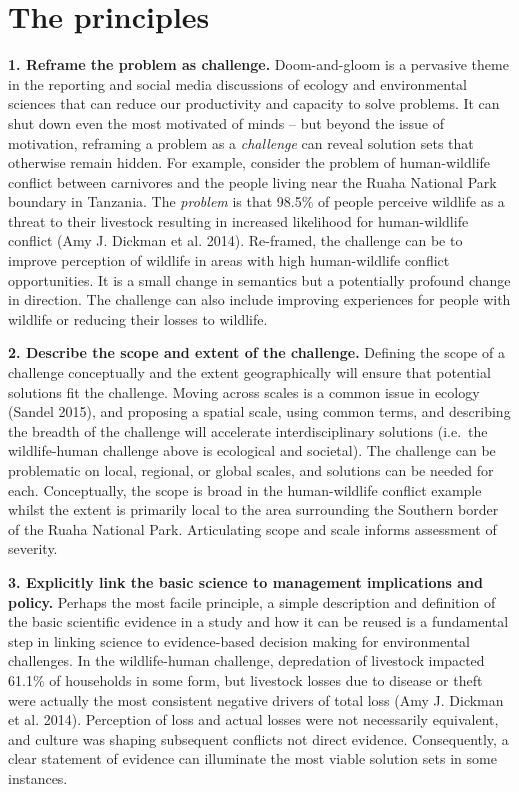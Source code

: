 \documentclass[fleqn,10pt]{wlpeerj} %
\begin{document}
\section*{The principles}\label{the-principles}

\textbf{1. Reframe the problem as challenge.} Doom-and-gloom is a
pervasive theme in the reporting and social media discussions of ecology
and environmental sciences that can reduce our productivity and capacity
to solve problems. It can shut down even the most motivated of minds --
but beyond the issue of motivation, reframing a problem as a
\emph{challenge} can reveal solution sets that otherwise remain hidden.
For example, consider the problem of human-wildlife conflict between
carnivores and the people living near the Ruaha National Park boundary
in Tanzania. The \emph{problem} is that 98.5\% of people perceive
wildlife as a threat to their livestock resulting in increased
likelihood for human-wildlife conflict (Amy J. Dickman et al. 2014).
Re-framed, the challenge can be to improve perception of wildlife in
areas with high human-wildlife conflict opportunities. It is a small
change in semantics but a potentially profound change in direction. The
challenge can also include improving experiences for people with
wildlife or reducing their losses to wildlife.

\textbf{2. Describe the scope and extent of the challenge.} Defining the
scope of a challenge conceptually and the extent geographically will
ensure that potential solutions fit the challenge. Moving across scales
is a common issue in ecology (Sandel 2015), and proposing a spatial
scale, using common terms, and describing the breadth of the challenge
will accelerate interdisciplinary solutions (i.e.~the wildlife-human
challenge above is ecological and societal). The challenge can be
problematic on local, regional, or global scales, and solutions can be
needed for each. Conceptually, the scope is broad in the human-wildlife
conflict example whilst the extent is primarily local to the area
surrounding the Southern border of the Ruaha National Park. Articulating
scope and scale informs assessment of severity.

\textbf{3. Explicitly link the basic science to management implications
and policy.} Perhaps the most facile principle, a simple description and
definition of the basic scientific evidence in a study and how it can be
reused is a fundamental step in linking science to evidence-based
decision making for environmental challenges. In the wildlife-human
challenge, depredation of livestock impacted 61.1\% of households in
some form, but livestock losses due to disease or theft were actually
the most consistent negative drivers of total loss (Amy J. Dickman et
al. 2014). Perception of loss and actual losses were not necessarily
equivalent, and culture was shaping subsequent conflicts not direct
evidence. Consequently, a clear statement of evidence can illuminate the
most viable solution sets in some instances.
\end{document}

